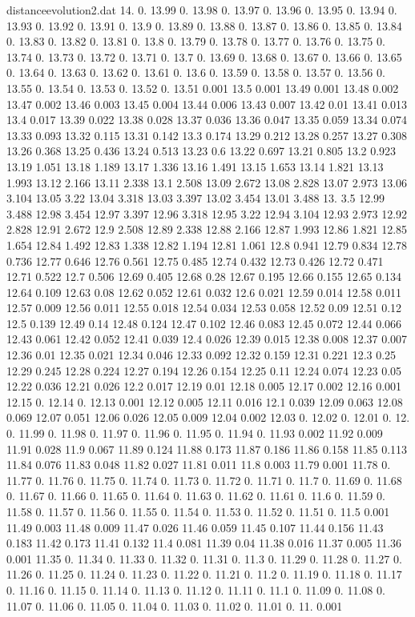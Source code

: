 \documentclass[a4paper,12pt,listof=totoc,index=totoc,bibliography=totoc,headsepline=false,headings=normal,BCOR16.153846mm,DIV12,headinclude,twoside,cleardoublepage=empty,numbers=noenddot,final]{scrreprt}
\theoremstyle{mystyle}
\numberwithin{equation}{section}
\numberwithin{figure}{section}
\numberwithin{lemma}{section}
\numberwithin{theorem}{section}
\numberwithin{corollary}{section}
\numberwithin{definition}{section}
\numberwithin{conjecture}{section}
\numberwithin{observation}{section}
\newcommand{\+}{\mkern2mu}
\DeclareMathOperator{\1}{\mathds{1}}
\begin{document}
\begin{filecontents}{distanceevolution2.dat}
14.	0.
13.99	0.
13.98	0.
13.97	0.
13.96	0.
13.95	0.
13.94	0.
13.93	0.
13.92	0.
13.91	0.
13.9	0.
13.89	0.
13.88	0.
13.87	0.
13.86	0.
13.85	0.
13.84	0.
13.83	0.
13.82	0.
13.81	0.
13.8	0.
13.79	0.
13.78	0.
13.77	0.
13.76	0.
13.75	0.
13.74	0.
13.73	0.
13.72	0.
13.71	0.
13.7	0.
13.69	0.
13.68	0.
13.67	0.
13.66	0.
13.65	0.
13.64	0.
13.63	0.
13.62	0.
13.61	0.
13.6	0.
13.59	0.
13.58	0.
13.57	0.
13.56	0.
13.55	0.
13.54	0.
13.53	0.
13.52	0.
13.51	0.001
13.5	0.001
13.49	0.001
13.48	0.002
13.47	0.002
13.46	0.003
13.45	0.004
13.44	0.006
13.43	0.007
13.42	0.01
13.41	0.013
13.4	0.017
13.39	0.022
13.38	0.028
13.37	0.036
13.36	0.047
13.35	0.059
13.34	0.074
13.33	0.093
13.32	0.115
13.31	0.142
13.3	0.174
13.29	0.212
13.28	0.257
13.27	0.308
13.26	0.368
13.25	0.436
13.24	0.513
13.23	0.6
13.22	0.697
13.21	0.805
13.2	0.923
13.19	1.051
13.18	1.189
13.17	1.336
13.16	1.491
13.15	1.653
13.14	1.821
13.13	1.993
13.12	2.166
13.11	2.338
13.1	2.508
13.09	2.672
13.08	2.828
13.07	2.973
13.06	3.104
13.05	3.22
13.04	3.318
13.03	3.397
13.02	3.454
13.01	3.488
13.	3.5
12.99	3.488
12.98	3.454
12.97	3.397
12.96	3.318
12.95	3.22
12.94	3.104
12.93	2.973
12.92	2.828
12.91	2.672
12.9	2.508
12.89	2.338
12.88	2.166
12.87	1.993
12.86	1.821
12.85	1.654
12.84	1.492
12.83	1.338
12.82	1.194
12.81	1.061
12.8	0.941
12.79	0.834
12.78	0.736
12.77	0.646
12.76	0.561
12.75	0.485
12.74	0.432
12.73	0.426
12.72	0.471
12.71	0.522
12.7	0.506
12.69	0.405
12.68	0.28
12.67	0.195
12.66	0.155
12.65	0.134
12.64	0.109
12.63	0.08
12.62	0.052
12.61	0.032
12.6	0.021
12.59	0.014
12.58	0.011
12.57	0.009
12.56	0.011
12.55	0.018
12.54	0.034
12.53	0.058
12.52	0.09
12.51	0.12
12.5	0.139
12.49	0.14
12.48	0.124
12.47	0.102
12.46	0.083
12.45	0.072
12.44	0.066
12.43	0.061
12.42	0.052
12.41	0.039
12.4	0.026
12.39	0.015
12.38	0.008
12.37	0.007
12.36	0.01
12.35	0.021
12.34	0.046
12.33	0.092
12.32	0.159
12.31	0.221
12.3	0.25
12.29	0.245
12.28	0.224
12.27	0.194
12.26	0.154
12.25	0.11
12.24	0.074
12.23	0.05
12.22	0.036
12.21	0.026
12.2	0.017
12.19	0.01
12.18	0.005
12.17	0.002
12.16	0.001
12.15	0.
12.14	0.
12.13	0.001
12.12	0.005
12.11	0.016
12.1	0.039
12.09	0.063
12.08	0.069
12.07	0.051
12.06	0.026
12.05	0.009
12.04	0.002
12.03	0.
12.02	0.
12.01	0.
12.	0.
11.99	0.
11.98	0.
11.97	0.
11.96	0.
11.95	0.
11.94	0.
11.93	0.002
11.92	0.009
11.91	0.028
11.9	0.067
11.89	0.124
11.88	0.173
11.87	0.186
11.86	0.158
11.85	0.113
11.84	0.076
11.83	0.048
11.82	0.027
11.81	0.011
11.8	0.003
11.79	0.001
11.78	0.
11.77	0.
11.76	0.
11.75	0.
11.74	0.
11.73	0.
11.72	0.
11.71	0.
11.7	0.
11.69	0.
11.68	0.
11.67	0.
11.66	0.
11.65	0.
11.64	0.
11.63	0.
11.62	0.
11.61	0.
11.6	0.
11.59	0.
11.58	0.
11.57	0.
11.56	0.
11.55	0.
11.54	0.
11.53	0.
11.52	0.
11.51	0.
11.5	0.001
11.49	0.003
11.48	0.009
11.47	0.026
11.46	0.059
11.45	0.107
11.44	0.156
11.43	0.183
11.42	0.173
11.41	0.132
11.4	0.081
11.39	0.04
11.38	0.016
11.37	0.005
11.36	0.001
11.35	0.
11.34	0.
11.33	0.
11.32	0.
11.31	0.
11.3	0.
11.29	0.
11.28	0.
11.27	0.
11.26	0.
11.25	0.
11.24	0.
11.23	0.
11.22	0.
11.21	0.
11.2	0.
11.19	0.
11.18	0.
11.17	0.
11.16	0.
11.15	0.
11.14	0.
11.13	0.
11.12	0.
11.11	0.
11.1	0.
11.09	0.
11.08	0.
11.07	0.
11.06	0.
11.05	0.
11.04	0.
11.03	0.
11.02	0.
11.01	0.
11.	0.001
\end{filecontents}
\end{document}
